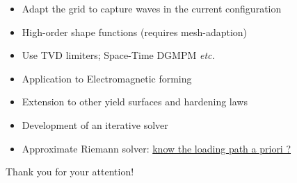 \documentclass[11pt,aspectratio=1610]{beamer}
\begin{document}
\begin{frame}[standout]{}
  \begin{footnotesize}
    \begin{block}{}
      \begin{itemize}
      \item[] Adapt the grid to capture waves in the current configuration
      \item[] High-order shape functions (requires mesh-adaption)
      \item[] Use TVD limiters; Space-Time DGMPM \textit{etc.}
      \item[] Application to Electromagnetic forming
      \end{itemize}
    \end{block}

    
    \begin{block}{}
      \begin{itemize}
      \item[] Extension to other yield surfaces and hardening laws
      \item[] Development of an iterative solver
      \item[] Approximate Riemann solver: \underline{know the loading path a priori ?}
      \end{itemize}
    \end{block}
  \end{footnotesize}

\end{frame}

\begin{frame}[standout]{}
  Thank you for your attention!
\end{frame}

\appendix


\end{document}
